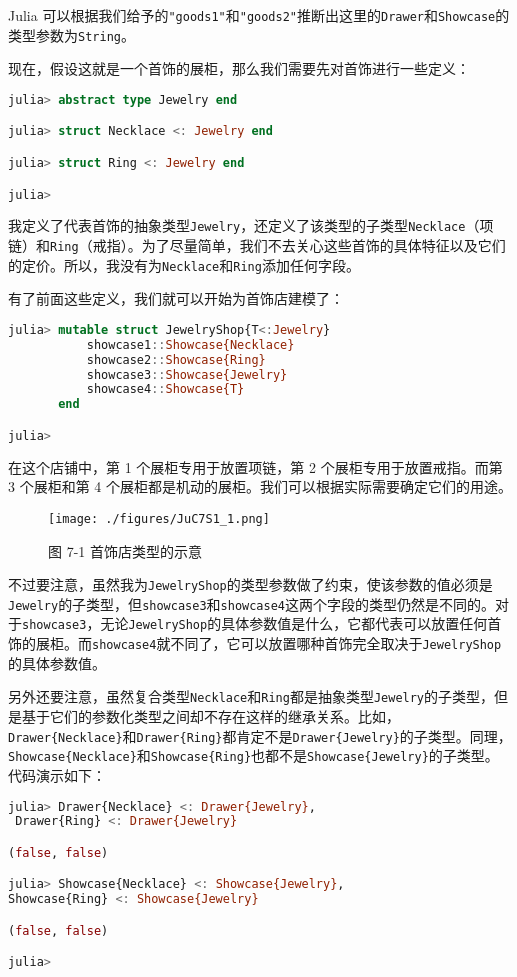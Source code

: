 Julia 可以根据我们给予的\verb|"goods1"|和\verb|"goods2"|推断出这里的\verb|Drawer|和\verb|Showcase|的类型参数为\verb|String|。

现在，假设这就是一个首饰的展柜，那么我们需要先对首饰进行一些定义：
\begin{lstlisting}[language=julia]
julia> abstract type Jewelry end

julia> struct Necklace <: Jewelry end

julia> struct Ring <: Jewelry end

julia> 
\end{lstlisting}

我定义了代表首饰的抽象类型\verb|Jewelry|，还定义了该类型的子类型\verb|Necklace|（项链）和\verb|Ring|（戒指）。为了尽量简单，我们不去关心这些首饰的具体特征以及它们的定价。所以，我没有为\verb|Necklace|和\verb|Ring|添加任何字段。

有了前面这些定义，我们就可以开始为首饰店建模了：
\begin{lstlisting}[language=julia]
julia> mutable struct JewelryShop{T<:Jewelry}
           showcase1::Showcase{Necklace}
           showcase2::Showcase{Ring}
           showcase3::Showcase{Jewelry}
           showcase4::Showcase{T}
       end

julia> 
\end{lstlisting}

在这个店铺中，第 1 个展柜专用于放置项链，第 2 个展柜专用于放置戒指。而第 3 个展柜和第 4 个展柜都是机动的展柜。我们可以根据实际需要确定它们的用途。
\begin{figure}[ht]
\centering
\texttt{[image: ./figures/JuC7S1\_1.png]}
\caption{图 7-1 首饰店类型的示意} \label{JuC7S1_fig1}
\end{figure}

不过要注意，虽然我为\verb|JewelryShop|的类型参数做了约束，使该参数的值必须是\verb|Jewelry|的子类型，但\verb|showcase3|和\verb|showcase4|这两个字段的类型仍然是不同的。对于\verb|showcase3|，无论\verb|JewelryShop|的具体参数值是什么，它都代表可以放置任何首饰的展柜。而\verb|showcase4|就不同了，它可以放置哪种首饰完全取决于\verb|JewelryShop|的具体参数值。

另外还要注意，虽然复合类型\verb|Necklace|和\verb|Ring|都是抽象类型\verb|Jewelry|的子类型，但是基于它们的参数化类型之间却不存在这样的继承关系。比如，\verb|Drawer{Necklace}|和\verb|Drawer{Ring}|都肯定不是\verb|Drawer{Jewelry}|的子类型。同理，\verb|Showcase{Necklace}|和\verb|Showcase{Ring}|也都不是\verb|Showcase{Jewelry}|的子类型。代码演示如下：
\begin{lstlisting}[language=julia]
julia> Drawer{Necklace} <: Drawer{Jewelry},
 Drawer{Ring} <: Drawer{Jewelry}

(false, false)

julia> Showcase{Necklace} <: Showcase{Jewelry}, 
Showcase{Ring} <: Showcase{Jewelry}

(false, false)

julia> 
\end{lstlisting}

